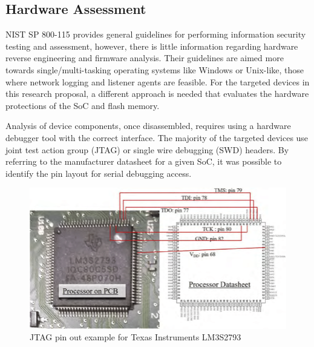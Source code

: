 
\subsection{Hardware Assessment} \label{hardwareassessment}

NIST SP 800-115 \autocite{NISTSP8001152020} provides general guidelines for performing information security testing and assessment, however, there is little information regarding hardware reverse engineering and firmware analysis. Their guidelines are aimed more towards single/multi-tasking operating systems like Windows or Unix-like, those where network logging and listener agents are feasible. For the targeted devices in this research proposal, a different approach is needed that evaluates the hardware protections of the SoC and flash memory. 

Analysis of device components, once disassembled, requires using a hardware debugger tool with the correct interface. The majority of the targeted devices use joint test action group (JTAG) or single wire debugging (SWD) headers. By referring to the manufacturer datasheet for a given SoC, it was possible to identify the pin layout for serial debugging access.

\begin{figure}[ht]%
  \centering
  \includegraphics[keepaspectratio]{Figures/JTAGExample.png}
  \caption{JTAG pin out example for Texas Instruments LM3S2793}%
  \label{fig:jtag_pinout}%
\end{figure}

